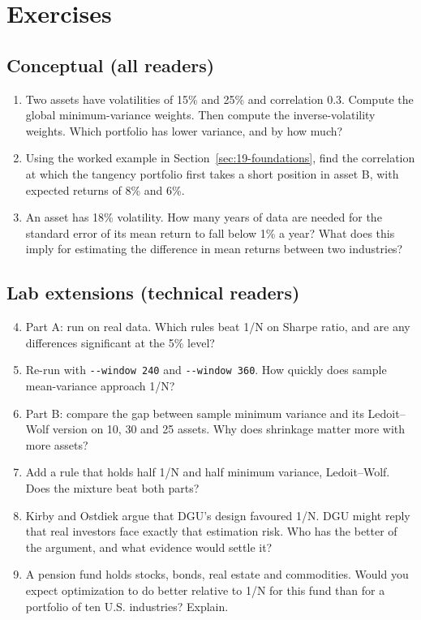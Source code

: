 \section*{Exercises}

\subsection*{Conceptual (all readers)}

\begin{enumerate}
  \item Two assets have volatilities of 15\% and 25\% and correlation 0.3. Compute the global minimum-variance weights. Then compute the inverse-volatility weights. Which portfolio has lower variance, and by how much?
  \item Using the worked example in Section~\ref{sec:19-foundations}, find the correlation at which the tangency portfolio first takes a short position in asset B, with expected returns of 8\% and 6\%.
  \item An asset has 18\% volatility. How many years of data are needed for the standard error of its mean return to fall below 1\% a year? What does this imply for estimating the difference in mean returns between two industries?
\end{enumerate}

\subsection*{Lab extensions (technical readers)}

\begin{enumerate}
  \setcounter{enumi}{3}
  \item Part A: run on real data. Which rules beat 1/N on Sharpe ratio, and are any differences significant at the 5\% level?
  \item Re-run with \texttt{-{}-window 240} and \texttt{-{}-window 360}. How quickly does sample mean-variance approach 1/N?
  \item Part B: compare the gap between sample minimum variance and its Ledoit--Wolf version on 10, 30 and 25 assets. Why does shrinkage matter more with more assets?
  \item Add a rule that holds half 1/N and half minimum variance, Ledoit--Wolf. Does the mixture beat both parts?
  \item Kirby and Ostdiek argue that DGU's design favoured 1/N. DGU might reply that real investors face exactly that estimation risk. Who has the better of the argument, and what evidence would settle it?
  \item A pension fund holds stocks, bonds, real estate and commodities. Would you expect optimization to do better relative to 1/N for this fund than for a portfolio of ten U.S. industries? Explain.
\end{enumerate}

